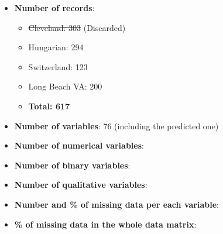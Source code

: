 \documentclass[a4paper,12pt]{article}
\begin{document}
    \begin{itemize}
    
        \item \textbf{Number of records}:
        \begin{itemize}
        
            \item \st{Cleveland: 303} (Discarded)
            \item Hungarian: 294
            \item Switzerland: 123
            \item Long Beach VA: 200
            \item \textbf{Total: 617}
            
        \end{itemize}
        \item \textbf{Number of variables}: 76 (including the predicted one)
        \item \textbf{Number of numerical variables}: 
        \item \textbf{Number of binary variables}: 
        \item \textbf{Number of qualitative variables}:
        \item \textbf{Number and \% of missing data per each variable}: 
        \item \textbf{\% of missing data in the whole data matrix}:
        
    \end{itemize}
\end{document}
